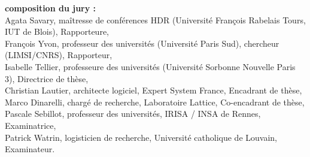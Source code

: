 \documentclass[12pt,a4paper,times,twoside,openright]{report}
\begin{document}
\begin{titlepage}
\begin{center}
\begin{footnotesize}
\begin{flushleft}
\textbf{composition du jury :}\\
{Agata Savary, maîtresse de conférences HDR (Université François Rabelais Tours, IUT de Blois), Rapporteure,}\\
{François Yvon, professeur des universités (Université Paris Sud), chercheur (LIMSI/CNRS), Rapporteur,}\\
{Isabelle Tellier, professeure des universités (Université Sorbonne Nouvelle Paris 3), Directrice de thèse,}\\
{Christian Lautier, architecte logiciel, Expert System France, Encadrant de thèse,}\\
{Marco Dinarelli, chargé de recherche, Laboratoire Lattice, Co-encadrant de thèse,}\\
{Pascale Sebillot, professeur des universités, IRISA / INSA de Rennes, Examinatrice,}\\
{Patrick Watrin, logisticien de recherche, Université catholique de Louvain, Examinateur.}\\
\end{flushleft}
\end{footnotesize}


\end{center}
\end{titlepage}
\end{document}
